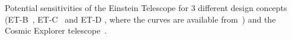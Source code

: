 \label{fig:etsens}
Potential sensitivities of the Einstein Telescope for 3 different
design concepts (ET-B~\cite{Hild:2008}, ET-C~\cite{Hild:2010b} and ET-D
\cite{Hild:2010}, where the curves are available from~\cite{etcurves}) and the
Cosmic Explorer telescope~\cite{2016arXiv160708697A}.